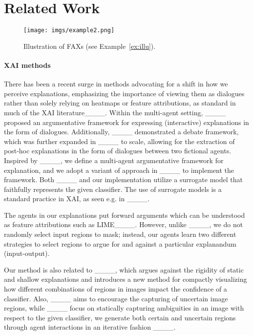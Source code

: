 \section{Related Work}
\label{sec:related_Work}
\begin{figure}
    \centering  \texttt{[image: imgs/example2.png]}
    \caption{
    Illustration of FAXs (see Example~\ref{ex:illu}). }
    \label{fig:example}
    \vspace{-10pt}
\end{figure}

\paragraph{XAI methods} 
There has been a recent surge in methods advocating for a shift in how we perceive explanations, emphasizing the importance of viewing them as dialogues rather than solely relying on heatmaps or feature attributions, as %
standard in much of the XAI literature____. 
Within the multi-agent setting,
____ proposed an argumentative framework for expressing (interactive) explanations in the form of dialogues. 
Additionally, ____ demonstrated a debate framework, which was further expanded in ____ to scale, allowing for the extraction of post-hoc explanations in the form of dialogues between two fictional %
agents.
Inspired by ____, we define a multi-agent argumentative framework for explanation, 
and we adopt a variant of approach in ____ to implement the framework.
%
Both ____ and our implementation utilize a surrogate model that faithfully represents the given classifier. 
The use of surrogate models is a standard practice in XAI, as seen e.g. in ____.

 
The agents in our explanations put forward arguments which can be understood as feature attributions such as 
LIME____.
However, unlike ____, we do not randomly select input regions to mask; instead, %
our agents learn two different strategies to select regions to argue for and against a particular explanandum (input-output).

Our method is also related to
____, which argues against the rigidity of static and shallow explanations and introduces a new method for compactly visualizing how different combinations of regions in images impact the confidence of a classifier. 
Also, ____ aims to encourage the capturing of uncertain image regions, 
while ____ focus on statically capturing ambiguities in an image with respect to the given classifier, we generate both certain and uncertain regions through %
agent interactions in an iterative fashion ____.


